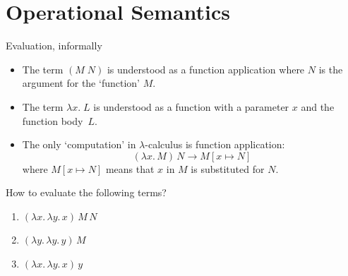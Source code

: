 \section{Operational Semantics}
\begin{frame}{Evaluation, informally}
  \begin{itemize}
    \item The term $(M\;N)$ is understood as a function application where
      $N$ is the argument for the `function' $M$.
    \item The term $\lambda x.\; L$ is understood as a function with a parameter
      $x$ and the function body~$L$. 
    \item The only \alert{`computation'} in $\lambda$-calculus
      is function application:
    \[
      (\lambda x.\, M)\,N \longrightarrow M[x \mapsto N]
    \]
    where $M[x \mapsto N]$ means that $x$ in $M$ is substituted for $N$. 
  \end{itemize}
  How to evaluate the following terms? 
  \begin{enumerate}
    \item $(\lambda x.\,\lambda y.\,x)\,M\,N$
    \item $(\lambda y.\,\lambda y.\,y)\,M$
    \item $(\lambda x.\, \lambda y.\,x)\,y$
  \end{enumerate}
\end{frame}
%
